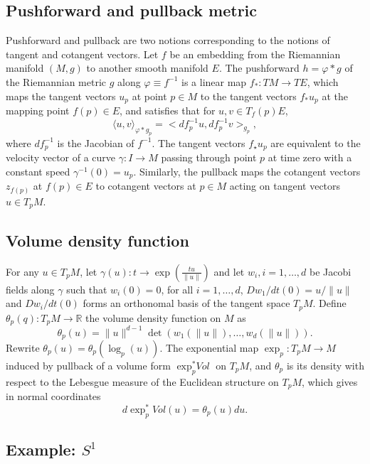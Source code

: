 \documentclass[11pt,a4paper,]{article}
\begin{document}
\hypertarget{pushforward-and-pullback-metric}{%
\subsection{Pushforward and pullback metric}\label{pushforward-and-pullback-metric}}

Pushforward and pullback are two notions corresponding to the notions of tangent and cotangent vectors. Let \(f\) be an embedding from the Riemannian manifold \((M,g)\) to another smooth manifold \(E\). The pushforward \(h=\varphi*g\) of the Riemannian metric \(g\) along \(\varphi \equiv f^{-1}\) is a linear map \(f_*:TM \rightarrow TE\), which maps the tangent vectors \(u_p\) at point \(p \in M\) to the tangent vectors \(f_*u_p\) at the mapping point \(f(p) \in E\), and satisfies that for \(u, v \in T_f(p)E\),
\[
\langle u,v \rangle_{\varphi*g_p} = <df_p^{-1}u, df_p^{-1}v>_{g_p},
\]
where \(df_p^{-1}\) is the Jacobian of \(f^{-1}\). The tangent vectors \(f_\star u_p\) are equivalent to the velocity vector of a curve \(\gamma: I\rightarrow M\) passing through point \(p\) at time zero with a constant speed \(\gamma^{-1}(0)=u_p\). Similarly, the pullback maps the cotangent vectors \(z_{f(p)}\) at \(f(p) \in E\) to cotangent vectors at \(p \in M\) acting on tangent vectors \(u \in T_pM\).

\hypertarget{volume-density-function-1}{%
\subsection{Volume density function}\label{volume-density-function-1}}

For any \(u \in T_pM\), let \(\gamma(u): t \rightarrow \exp(\frac{tu}{\|u\|})\) and let \(w_i, i=1,\dots,d\) be Jacobi fields along \(\gamma\) such that \(w_i(0)=0\), for all \(i=1,\dots,d\), \(Dw_1/dt(0)=u/\|u\|\) and \(Dw_i/dt(0)\) forms an orthonomal basis of the tangent space \(T_pM\). Define \(\theta_p(q): T_pM \rightarrow \mathbb{R}\) the volume density function on \(M\) as
\[
\theta_p(u) = \|u\|^{d-1} \det(w_1(\|u\|),\dots,w_d(\|u\|)).
\]
Rewrite \(\theta_p(u) = \theta_p(\log_p(u))\). The exponential map \(\exp_p: T_pM \rightarrow M\) induced by pullback of a volume form \(\exp_p^*\textit{Vol}\) on \(T_pM\), and \(\theta_p\) is its density with respect to the Lebesgue measure of the Euclidean structure on \(T_pM\), which gives in normal coordinates
\[
d\exp_p^*\textit{Vo}l(u) = \theta_p(u)du.
\]

\hypertarget{example-s1}{%
\subsection{\texorpdfstring{Example: \(S^1\)}{Example: S\^{}1}}\label{example-s1}}
\end{document}
